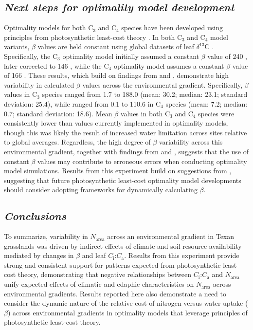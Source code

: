\subsection{\textit{Next steps for optimality model development}}
\noindent Optimality models for both C$_3$ and C$_4$ species have been developed using principles from photosynthetic least-cost theory . In both C$_3$ and C$_4$ model variants, $\beta$ values are held constant using global datasets of leaf $\delta^{13}$C . Specifically, the C$_3$ optimality model initially assumed a constant $\beta$ value of 240 , later corrected to 146 , while the C$_4$ optimality model assumes a constant $\beta$ value of 166 . These results, which build on findings from  and , demonstrate high variability in calculated $\beta$ values across the environmental gradient. Specifically, $\beta$ values in C$_3$ species ranged from 1.7 to 188.0 (mean: 30.2; median: 23.1; standard deviation: 25.4), while ranged from 0.1 to 110.6 in C$_4$ species (mean: 7.2; median: 0.7; standard deviation: 18.6). Mean $\beta$ values in both C$_3$ and C$_4$ species were consistently lower than values currently implemented in optimality models, though this was likely the result of increased water limitation across sites relative to global averages. Regardless, the high degree of $\beta$ variability across this environmental gradient, together with findings from  and , suggests that the use of constant $\beta$ values may contribute to erroneous errors when conducting optimality model simulations. Results from this experiment build on suggestions from , suggesting that future photosynthetic least-cost optimality model developments should consider adopting frameworks for dynamically calculating $\beta$.

\subsection{\textit{Conclusions}}
\noindent To summarize, variability in $N_\mathrm{area}$ across an environmental gradient in Texan grasslands was driven by indirect effects of climate and soil resource availability mediated by changes in $\beta$ and leaf $C_\mathrm{i}$:$C_\mathrm{a}$. Results from this experiment provide strong and consistent support for patterns expected from photosynthetic least-cost theory, demonstrating that negative relationships between $C_\mathrm{i}$:$C_\mathrm{a}$ and $N_\mathrm{area}$ unify expected effects of climatic and edaphic characteristics on $N_\mathrm{area}$ across environmental gradients. Results reported here also demonstrate a need to consider the dynamic nature of the relative cost of nitrogen versus water uptake ($\beta$) across environmental gradients in optimality models that leverage principles of photosynthetic least-cost theory.
